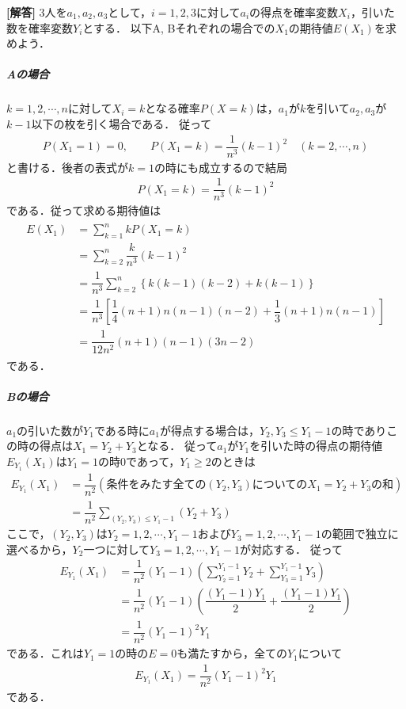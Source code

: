 \documentclass[../../main.tex]{subfiles}
\begin{document}
\begin{oframed}
  
\end{oframed}

{\bf [解答]}
3人を$a_1,a_2,a_3$として，$i=1,2,3$に対して$a_i$の得点を確率変数$X_i$，引いた数を確率変数$Y_i$とする．
以下A, Bそれぞれの場合での$X_1$の期待値$E(X_1)$を求めよう．

\subparagraph{Aの場合}

$k=1,2,\cdots, n$に対して$X_i=k$となる確率$P(X=k)$は，$a_1$が$k$を引いて$a_2,a_3$が$k-1$以下の枚を引く場合である．
従って
\begin{align}
  P(X_1=1)=0, \qquad P(X_1=k)=\dfrac{1}{n^3}(k-1)^2\quad(k=2,\cdots,n)
\end{align}
と書ける．後者の表式が$k=1$の時にも成立するので結局
\begin{align}
  P(X_1=k)=\dfrac{1}{n^3}(k-1)^2
\end{align}
である．従って求める期待値は
\begin{align}
  \begin{split}
    E(X_1)
    &=\sum_{k=1}^n kP(X_1=k) \\
    &=\sum_{k=2}^n\dfrac{k}{n^3}(k-1)^2 \\
    &=\dfrac{1}{n^3}\sum_{k=2}^n\left\{k(k-1)(k-2)+k(k-1)\right\} \\
    &=\dfrac{1}{n^3}\left[\dfrac{1}{4}(n+1)n(n-1)(n-2)+\dfrac{1}{3}(n+1)n(n-1)\right] \\
    &=\dfrac{1}{12n^2}(n+1)(n-1)(3n-2)
  \end{split} \label{eq:1}
\end{align}
である．

\subparagraph{Bの場合}

$a_1$の引いた数が$Y_1$である時に$a_1$が得点する場合は，$Y_2,Y_3\le Y_1-1$の時でありこの時の得点は$X_1=Y_2+Y_3$となる．
従って$a_1$が$Y_1$を引いた時の得点の期待値$E_{Y_1}(X_1)$は$Y_1=1$の時$0$であって，$Y_1\ge2$のときは
\begin{align}
  E_{Y_1}(X_1)
  &=\dfrac{1}{n^2}\left(\text{条件をみたす全ての}(Y_2,Y_3)\text{についての}X_1=Y_2+Y_3\text{の和}\right) \\
  &=\dfrac{1}{n^2}\sum_{(Y_2,Y_3) \le Y_1-1}(Y_2+Y_3)
\end{align}
ここで，$(Y_2,Y_3)$は$Y_2=1,2,\cdots,Y_1-1$および$Y_3=1,2,\cdots,Y_1-1$の範囲で独立に選べるから，$Y_2$一つに対して$Y_3=1,2,\cdots, Y_1-1$が対応する．
従って
\begin{align}
  E_{Y_1}(X_1)
  &=\dfrac{1}{n^2}\left(Y_1-1\right)\left(\sum_{Y_2=1}^{Y_1-1}Y_2+\sum_{Y_3=1}^{Y_1-1}Y_3\right) \\
  &=\dfrac{1}{n^2}\left(Y_1-1\right)\left(\dfrac{(Y_1-1)Y_1}{2}+\dfrac{(Y_1-1)Y_1}{2}\right) \\
  &=\dfrac{1}{n^2}(Y_1-1)^2Y_1
\end{align}
である．これは$Y_1=1$の時の$E=0$も満たすから，全ての$Y_1$について
\begin{align}
  E_{Y_1}(X_1) = \dfrac{1}{n^2}(Y_1-1)^2Y_1
\end{align}
である．
\end{document}
